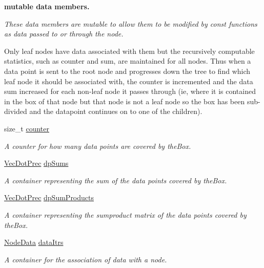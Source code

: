 \begin{Indent}{\bf mutable data members.}\par
{\em \-These data members are mutable to allow them to be modified by const functions as data passed to or through the node.

\-Only leaf nodes have data associated with them but the recursively computable statistics, such as counter and sum, are maintained for all nodes. \-Thus when a data point is sent to the root node and progresses down the tree to find which leaf node it should be associated with, the counter is incremented and the data sum increased for each non-\/leaf node it passes through (ie, where it is contained in the box of that node but that node is not a leaf node so the box has been sub-\/ divided and the datapoint continues on to one of the children). }\begin{DoxyCompactItemize}
\item 
size\-\_\-t \hyperlink{classsubpavings_1_1SPSnode_a890b23bcab9091b420d88b99d16badc5}{counter}
\begin{DoxyCompactList}\small\item\em \-A counter for how many data points are covered by the\-Box. \end{DoxyCompactList}\item 
\hyperlink{namespacesubpavings_ad8f0a077ee1c4678bcd1868f3aecd605}{\-Vec\-Dot\-Prec} \hyperlink{classsubpavings_1_1SPSnode_a1e5698e870376a507cd4a09bddc01643}{dp\-Sums}
\begin{DoxyCompactList}\small\item\em \-A container representing the sum of the data points covered by the\-Box. \end{DoxyCompactList}\item 
\hyperlink{namespacesubpavings_ad8f0a077ee1c4678bcd1868f3aecd605}{\-Vec\-Dot\-Prec} \hyperlink{classsubpavings_1_1SPSnode_a7ff8f1c83a231af97c32808e0851dc78}{dp\-Sum\-Products}
\begin{DoxyCompactList}\small\item\em \-A container representing the sumproduct matrix of the data points covered by the\-Box. \end{DoxyCompactList}\item 
\hyperlink{namespacesubpavings_af005697b49cff9ea37fc3bc9ed19da30}{\-Node\-Data} \hyperlink{classsubpavings_1_1SPSnode_a2d45b1e3b34a39d128143a0829f051f8}{data\-Itrs}
\begin{DoxyCompactList}\small\item\em \-A container for the association of data with a node. \end{DoxyCompactList}\end{DoxyCompactItemize}
\end{Indent}
